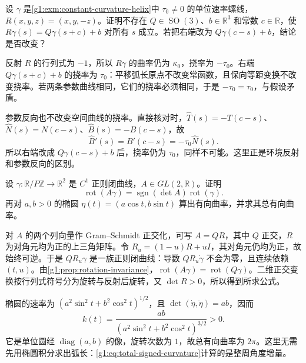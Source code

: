 \begin{exercise}
	\label{g1:ex:helix-mirror}
	设 \(\gamma\) 是\cref{g1:exm:constant-curvature-helix}中 \(\tau_0\ne0\) 的单位速率螺线，\(R(x,y,z)=(x,y,-z)\)。证明不存在 \(Q\in \operatorname{SO}(3)\)、\(b\in\mathbb R^3\) 和常数 \(c\in\mathbb R\)，使 \(R\gamma(s)=Q\gamma(s+c)+b\) 对所有 \(s\) 成立。若把右端改为 \(Q\gamma(c-s)+b\)，结论是否改变？
\end{exercise}
\begin{solution}
	反射 \(R\) 的行列式为 \(-1\)，所以 \(R\gamma\) 的曲率仍为 \(\kappa_0\)，挠率为 \(-\tau_0\)。右端 \(Q\gamma(s+c)+b\) 的挠率为 \(\tau_0\)：平移弧长原点不改变常函数，且保向等距变换不改变挠率。若两条参数曲线相同，它们的挠率必须相同，于是 \(-\tau_0=\tau_0\)，与假设矛盾。

	参数反向也不改变空间曲线的挠率。直接核对时，\(\widehat T(s)=-T(c-s)\)、\(\widehat N(s)=N(c-s)\)、\(\widehat B(s)=-B(c-s)\)，故
	\[
		\widehat B'(s)=B'(c-s)=-\tau_0\widehat N(s).
	\]
	所以右端改成 \(Q\gamma(c-s)+b\) 后，挠率仍为 \(\tau_0\)，同样不可能。这里正是环境反射和参数反向的区别。
\end{solution}

\begin{exercise}\label{g1:ex:affine-rotation}
	设 \(\gamma:\mathbb R/P\mathbb Z\rightarrow\mathbb R^2\) 是 \(C^1\) 正则闭曲线，\(A\in GL(2,\mathbb R)\)。证明
	\[
		\operatorname{rot}(A\gamma)=\operatorname{sgn}(\det A)\operatorname{rot}(\gamma).
	\]
	再对 \(a,b>0\) 的椭圆 \(\eta(t)=(a\cos t,b\sin t)\) 算出有向曲率，并求其总有向曲率。
\end{exercise}
\begin{solution}
	对 \(A\) 的两个列向量作 Gram--Schmidt 正交化，可写 \(A=QR\)，其中 \(Q\) 正交，\(R\) 为对角元均为正的上三角矩阵。令 \(R_u=(1-u)R+uI\)，其对角元仍均为正，故始终可逆。于是 \(QR_u\gamma\) 是一族正则闭曲线：导数 \(QR_u\dot\gamma\) 不会为零，且连续依赖 \((t,u)\)。由\cref{g1:prop:rotation-invariance}，\(\operatorname{rot}(A\gamma)=\operatorname{rot}(Q\gamma)\)。二维正交变换按行列式符号分为旋转与反射后旋转，又 \(\det R>0\)，所以得到所求公式。

	椭圆的速率为 \((a^2\sin^2t+b^2\cos^2t)^{1/2}\)，且 \(\det(\dot\eta,\ddot\eta)=ab\)，因而
	\[
		k(t)=\frac{ab}{(a^2\sin^2t+b^2\cos^2t)^{3/2}}>0.
	\]
	它是单位圆经 \(\operatorname{diag}(a,b)\) 的像，旋转次数为 \(1\)，故总有向曲率为 \(2\pi\)。这里无需先用椭圆积分求出弧长：\eqref{g1:eq:total-signed-curvature}计算的是整周角度增量。
\end{solution}

